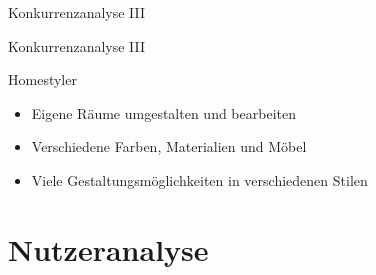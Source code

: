 \documentclass[presentation,bigger,aspectratio=169]{beamer}
\begin{document}
\begin{frame}[label={sec:orgcd927c4}]{Konkurrenzanalyse III}
\end{frame}
\begin{frame}[label={sec:org57dab92}]{Konkurrenzanalyse III}
\begin{block}{Homestyler}
\begin{itemize}
\item Eigene Räume umgestalten und bearbeiten
\item Verschiedene Farben, Materialien und Möbel
\item Viele Gestaltungsmöglichkeiten in verschiedenen Stilen
\end{itemize}
\end{block}
\end{frame}
\section{Nutzeranalyse}
\label{sec:org54c7ba4}
\begin{frame}[label={sec:org954bb56}]{\vspace{2.2cm}\begin{center}\MakeUppercase{\insertsection}\end{center}}
\end{frame}
\end{document}
